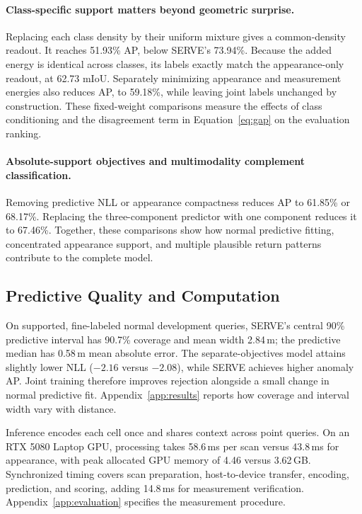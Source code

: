\documentclass{article}
\begin{document}
\paragraph{Class-specific support matters beyond geometric surprise.}
Replacing each class density by their uniform mixture gives a common-density readout. It reaches 51.93\% AP, below SERVE's 73.94\%. Because the added energy is identical across classes, its labels exactly match the appearance-only readout, at 62.73 mIoU. Separately minimizing appearance and measurement energies also reduces AP, to 59.18\%, while leaving joint labels unchanged by construction. These fixed-weight comparisons measure the effects of class conditioning and the disagreement term in Equation~\eqref{eq:gap} on the evaluation ranking.

\paragraph{Absolute-support objectives and multimodality complement classification.}
Removing predictive NLL or appearance compactness reduces AP to 61.85\% or 68.17\%. Replacing the three-component predictor with one component reduces it to 67.46\%. Together, these comparisons show how normal predictive fitting, concentrated appearance support, and multiple plausible return patterns contribute to the complete model.

\subsection{Predictive Quality and Computation}
On supported, fine-labeled normal development queries, SERVE's central 90\% predictive interval has 90.7\% coverage and mean width 2.84\,m; the predictive median has 0.58\,m mean absolute error. The separate-objectives model attains slightly lower NLL ($-2.16$ versus $-2.08$), while SERVE achieves higher anomaly AP. Joint training therefore improves rejection alongside a small change in normal predictive fit. Appendix~\ref{app:results} reports how coverage and interval width vary with distance.

Inference encodes each cell once and shares context across point queries. On an RTX 5080 Laptop GPU, processing takes 58.6\,ms per scan versus 43.8\,ms for appearance, with peak allocated GPU memory of 4.46 versus 3.62\,GB. Synchronized timing covers scan preparation, host-to-device transfer, encoding, prediction, and scoring, adding 14.8\,ms for measurement verification. Appendix~\ref{app:evaluation} specifies the measurement procedure.
\end{document}

